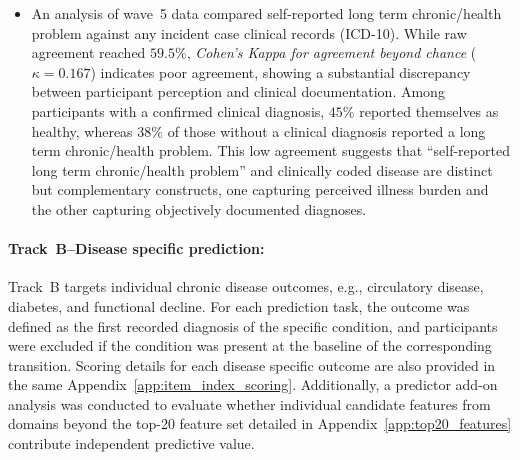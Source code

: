 \begin{itemize}
    \item An analysis of wave~5 data compared self-reported long term chronic/health problem against any incident case clinical records (ICD-10). While raw agreement reached $59.5\%$, \emph{Cohen's Kappa for agreement beyond chance} ($\kappa = 0.167$) indicates poor agreement, showing a substantial discrepancy between participant perception and clinical documentation. Among participants with a confirmed clinical diagnosis, $45\%$ reported themselves as healthy, whereas $38\%$ of those without a clinical diagnosis reported a long term chronic/health problem. This low agreement suggests that ``self-reported long term chronic/health problem'' and clinically coded disease are distinct but complementary constructs, one capturing perceived illness burden and the other capturing objectively documented diagnoses.
\end{itemize}

\begin{table}[ht]
\centering
\caption{Sample sizes and incidence rates by design for Track~A.}\label{tab:analysis_samples}
\end{table}

\paragraph{Track~B--Disease specific prediction:}\label{sc:track_b}
Track~B targets individual chronic disease outcomes, e.g., circulatory disease, diabetes, and functional decline. For each prediction task, the outcome was defined as the first recorded diagnosis of the specific condition, and participants were excluded if the condition was present at the baseline of the corresponding transition. Scoring details for each disease specific outcome are also provided in the same Appendix~\ref{app:item_index_scoring}. Additionally, a predictor add-on analysis was conducted to evaluate whether individual candidate features from domains beyond the top-20 feature set detailed in Appendix~\ref{app:top20_features} contribute independent predictive value.

